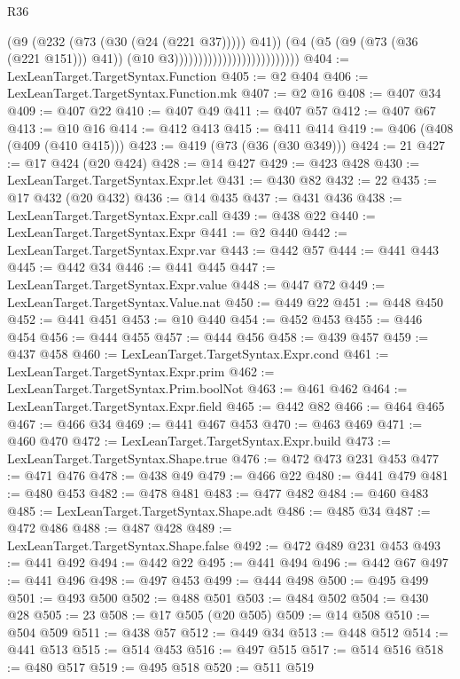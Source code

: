 \begin{lexlean}{R36}
\begin{coremodule}
{{{{{{{{{{{{{{{{{{{{{{{{{{{{{{{{{{{{{{{{{{{{{{{{{{{{{{{{{{{{{{{{{{{{{{{{{{{{{{{{{{                                                      (@9 (@232 (@73 (@30 (@24 (@221 @37))))) @41))
                                                    (@4
                                                      (@5 (@9 (@73 (@36 (@221 @151))) @41))
                                                      (@10 @3))))))))))))))))))))))))))
@404 := LexLeanTarget.TargetSyntax.Function
@405 := @2 @404
@406 := LexLeanTarget.TargetSyntax.Function.mk
@407 := @2 @16
@408 := @407 @34
@409 := @407 @22
@410 := @407 @49
@411 := @407 @57
@412 := @407 @67
@413 := @10 @16
@414 := @412 @413
@415 := @411 @414
@419 := @406 (@408 (@409 (@410 @415)))
@423 := @419 (@73 (@36 (@30 @349)))
@424 := 21
@427 := @17 @424 (@20 @424)
@428 := @14 @427
@429 := @423 @428
@430 := LexLeanTarget.TargetSyntax.Expr.let
@431 := @430 @82
@432 := 22
@435 := @17 @432 (@20 @432)
@436 := @14 @435
@437 := @431 @436
@438 := LexLeanTarget.TargetSyntax.Expr.call
@439 := @438 @22
@440 := LexLeanTarget.TargetSyntax.Expr
@441 := @2 @440
@442 := LexLeanTarget.TargetSyntax.Expr.var
@443 := @442 @57
@444 := @441 @443
@445 := @442 @34
@446 := @441 @445
@447 := LexLeanTarget.TargetSyntax.Expr.value
@448 := @447 @72
@449 := LexLeanTarget.TargetSyntax.Value.nat
@450 := @449 @22
@451 := @448 @450
@452 := @441 @451
@453 := @10 @440
@454 := @452 @453
@455 := @446 @454
@456 := @444 @455
@457 := @444 @456
@458 := @439 @457
@459 := @437 @458
@460 := LexLeanTarget.TargetSyntax.Expr.cond
@461 := LexLeanTarget.TargetSyntax.Expr.prim
@462 := LexLeanTarget.TargetSyntax.Prim.boolNot
@463 := @461 @462
@464 := LexLeanTarget.TargetSyntax.Expr.field
@465 := @442 @82
@466 := @464 @465
@467 := @466 @34
@469 := @441 @467 @453
@470 := @463 @469
@471 := @460 @470
@472 := LexLeanTarget.TargetSyntax.Expr.build
@473 := LexLeanTarget.TargetSyntax.Shape.true
@476 := @472 @473 @231 @453
@477 := @471 @476
@478 := @438 @49
@479 := @466 @22
@480 := @441 @479
@481 := @480 @453
@482 := @478 @481
@483 := @477 @482
@484 := @460 @483
@485 := LexLeanTarget.TargetSyntax.Shape.adt
@486 := @485 @34
@487 := @472 @486
@488 := @487 @428
@489 := LexLeanTarget.TargetSyntax.Shape.false
@492 := @472 @489 @231 @453
@493 := @441 @492
@494 := @442 @22
@495 := @441 @494
@496 := @442 @67
@497 := @441 @496
@498 := @497 @453
@499 := @444 @498
@500 := @495 @499
@501 := @493 @500
@502 := @488 @501
@503 := @484 @502
@504 := @430 @28
@505 := 23
@508 := @17 @505 (@20 @505)
@509 := @14 @508
@510 := @504 @509
@511 := @438 @57
@512 := @449 @34
@513 := @448 @512
@514 := @441 @513
@515 := @514 @453
@516 := @497 @515
@517 := @514 @516
@518 := @480 @517
@519 := @495 @518
@520 := @511 @519
}}}}}}}}}}}}}}}}}}}}}}}}}}}}}}}}}}}}}}}}}}}}}}}}}}}}}}}}}}}}}}}}}}}}}}}}}}}}}}}}}}
\end{coremodule}
\end{lexlean}
